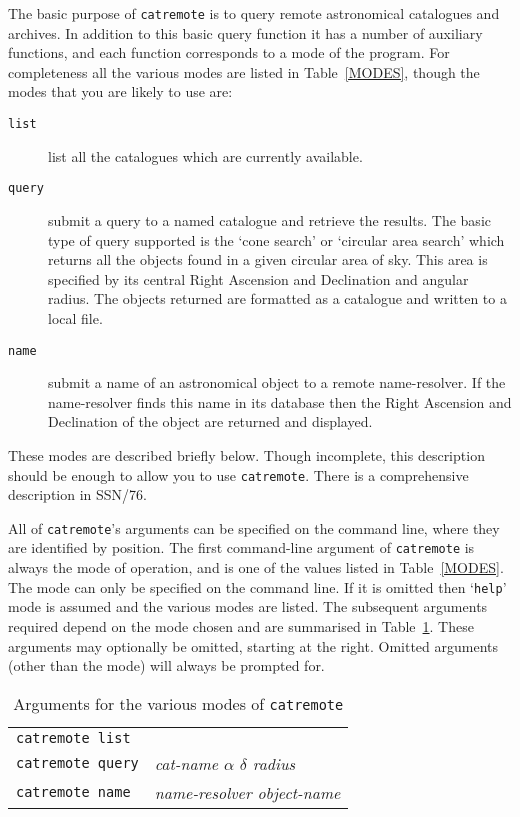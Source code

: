 \documentclass[twoside,11pt]{article}
\newcommand{\xref}[3]{#1}
\renewcommand{\_}{\texttt{\symbol{95}}}
\begin{document}
The basic purpose of {\tt catremote} is to query remote astronomical
catalogues and archives.  In addition to this basic query function it has
a number of auxiliary functions, and each function corresponds to a mode
of the program.  For completeness all the various modes are listed in
Table~\ref{MODES}, though the modes that you are likely to use are:

\begin{description}

  \item[{\tt list}] list all the catalogues which are currently available.

  \item[{\tt query}] submit a query to a named catalogue and retrieve the
   results.  The basic type of query supported is the `cone search' or
   `circular area search' which returns all the objects found in a given
   circular area of sky.  This area is specified by its central Right
   Ascension and Declination and angular radius.  The objects returned are
   formatted as a catalogue and written to a local file.

  \item[{\tt name}] submit a name of an astronomical object to a remote
   name-resolver.  If the name-resolver finds this name in its database
   then the Right Ascension and Declination of the object are returned and
   displayed.

\end{description}

These modes are described briefly below.  Though incomplete, this
description should be enough to allow you to use {\tt catremote}.  There
is a comprehensive description in \xref{SSN/76}{ssn76}{}\cite{SSN76}.

All of {\tt catremote}'s arguments can be specified on the command line,
where they are identified by position.  The first command-line argument of
{\tt catremote} is always the mode of operation, and is one of the values
listed in Table~\ref{MODES}.  The mode can only be specified on the
command line.  If it is omitted then `{\tt help}' mode is assumed and the
various modes are listed.  The subsequent arguments required depend on the
mode chosen and are summarised in Table~\ref{ARGS}.  These arguments may
optionally be omitted, starting at the right.  Omitted arguments (other
than the mode) will always be prompted for.

\begin{table}[htbp]

\begin{center}
\begin{tabular}{ll}
{\tt catremote list}    & \\
{\tt catremote query}   & {\it cat-name $\alpha$ $\delta$ radius} \\
{\tt catremote name}    & {\it name-resolver object-name} \\
\end{tabular}
\end{center}

\caption{Arguments for the various modes of {\tt catremote}
\label{ARGS} }

\end{table}
\end{document}
